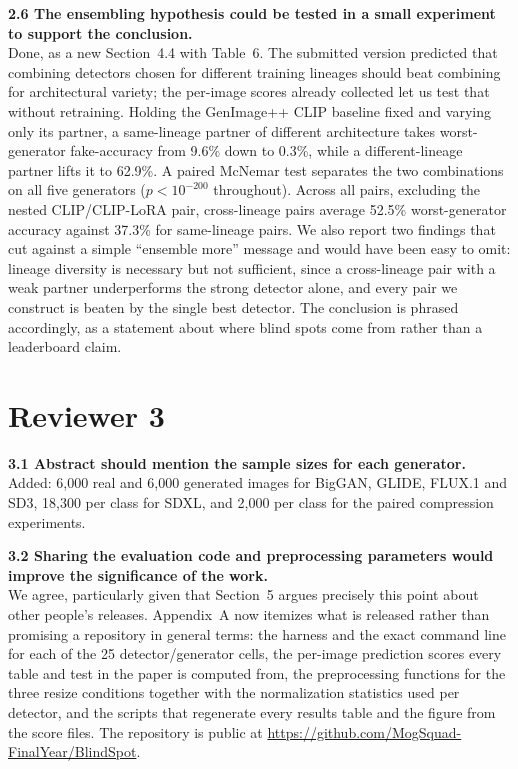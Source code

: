 \documentclass[11pt]{article}
\begin{document}
\noindent\textbf{2.6 The ensembling hypothesis could be tested in a small
experiment to support the conclusion.}\\[1pt]
Done, as a new Section~4.4 with Table~6.
The submitted version predicted that combining detectors chosen for
different training lineages should beat combining for architectural
variety; the per-image scores already collected let us test that without
retraining. Holding the GenImage++ CLIP baseline fixed and varying only
its partner, a same-lineage partner of different architecture takes
worst-generator fake-accuracy from 9.6\% down to 0.3\%, while a
different-lineage partner lifts it to 62.9\%. A paired McNemar test
separates the two combinations on all five generators
($p<10^{-200}$ throughout). Across all pairs, excluding the nested
CLIP/CLIP-LoRA pair, cross-lineage pairs average 52.5\% worst-generator
accuracy against 37.3\% for same-lineage pairs. We also report two
findings that cut against a simple ``ensemble more'' message and would
have been easy to omit: lineage diversity is necessary but not sufficient,
since a cross-lineage pair with a weak partner underperforms the strong
detector alone, and every pair we construct is beaten by the single best
detector. The conclusion is phrased accordingly, as a statement about
where blind spots come from rather than a leaderboard claim.

\section*{Reviewer 3}

\noindent\textbf{3.1 Abstract should mention the sample sizes for each
generator.}\\[1pt]
Added: 6{,}000 real and 6{,}000 generated images for BigGAN, GLIDE, FLUX.1
and SD3, 18{,}300 per class for SDXL, and 2{,}000 per class for the paired
compression experiments.

\noindent\textbf{3.2 Sharing the evaluation code and preprocessing
parameters would improve the significance of the work.}\\[1pt]
We agree, particularly given that Section~5 argues
precisely this point about other people's releases. Appendix~A now
itemizes what is released rather than promising a repository in general
terms: the harness and the exact command line for each of the 25
detector/generator cells, the per-image prediction scores every table and
test in the paper is computed from, the preprocessing functions for the
three resize conditions together with the normalization statistics used
per detector, and the scripts that regenerate every results table and the
figure from the score files. The repository is public at
\url{https://github.com/MogSquad-FinalYear/BlindSpot}.
\end{document}

